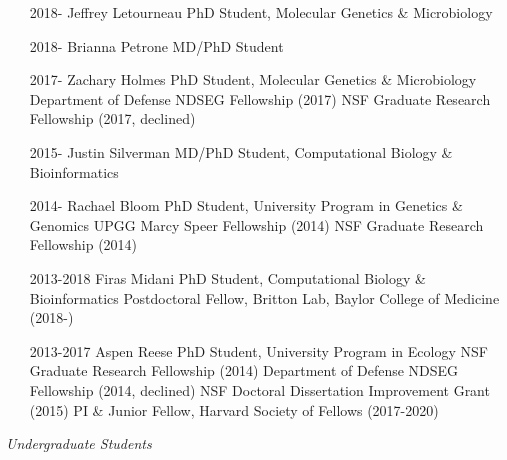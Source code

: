 \documentclass[overlapped,line,11pt]{res}
\begin{document}
\begin{resume}
\begin{itemize}[leftmargin=2cm, style=sameline, itemsep=0mm]
\item[2018-] Jeffrey Letourneau \newline 
  PhD Student, Molecular Genetics \& Microbiology 
\item[2018-] Brianna Petrone \newline 
  MD/PhD Student
\item[2017-] Zachary Holmes \newline 
  PhD Student, Molecular Genetics \& Microbiology \newline
  Department of Defense NDSEG Fellowship (2017) \newline
  NSF Graduate Research Fellowship (2017, declined)
\item[2015-] Justin Silverman \newline 
  MD/PhD Student, Computational Biology \& Bioinformatics
\item[2014-] Rachael Bloom \newline 
  PhD Student, University Program in Genetics \& Genomics \newline
  UPGG Marcy Speer Fellowship (2014) \newline
  NSF Graduate Research Fellowship (2014)
\item[2013-2018] Firas Midani \newline 
  PhD Student, Computational Biology \& Bioinformatics \newline
  Postdoctoral Fellow, Britton Lab, Baylor College of Medicine (2018-)
\item[2013-2017] Aspen Reese \newline 
  PhD Student, University Program in Ecology \newline
  NSF Graduate Research Fellowship (2014) \newline
  Department of Defense NDSEG Fellowship (2014, declined) \newline
  NSF Doctoral Dissertation Improvement Grant (2015) \newline
  PI \& Junior Fellow, Harvard Society of Fellows (2017-2020)\newline
\end{itemize}

\vspace{-.1in}

\emph{Undergraduate Students}
\vspace{.1in}
\begin{itemize}[leftmargin=2cm, style=sameline, itemsep=0mm]


\end{itemize}
\end{resume}
\end{document}
